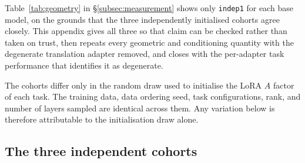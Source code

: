 Table~\ref{tab:geometry} in \S\ref{subsec:measurement} shows only
\texttt{indep1} for each base model, on the grounds that the three
independently initialised cohorts agree closely. This appendix gives all
three so that claim can be checked rather than taken on trust, then
repeats every geometric and conditioning quantity with the degenerate
translation adapter removed, and closes with the per-adapter task
performance that identifies it as degenerate.

The cohorts differ only in the random draw used to initialise the LoRA
$A$ factor of each task. The training data, data ordering seed, task
configurations, rank, and number of layers sampled are identical across
them. Any variation below is therefore attributable to the
initialisation draw alone.

\subsection{The three independent cohorts}

